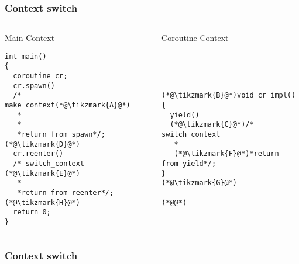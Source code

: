 \documentclass{beamer}
\def\tikzmark#1{\tikz[remember picture,overlay]\node[yshift=2pt](#1){};}
\begin{document}

\begin{frame}[fragile]
\frametitle{Context switch}
\begin{columns}
\begin{column}{0.49\textwidth}
\begin{block}{Main Context}
\begin{lstlisting}[basicstyle=\small]
int main()
{
  coroutine cr;
  cr.spawn()
  /* make_context(*@\tikzmark{A}@*)
   *
   * 
   *return from spawn*/;(*@\tikzmark{D}@*)
  cr.reenter()
  /* switch_context (*@\tikzmark{E}@*)
   *
   *return from reenter*/;(*@\tikzmark{H}@*)
  return 0;
}
\end{lstlisting}
\end{block}
\end{column}
\begin{column}{0.49\textwidth}
\begin{block}{Coroutine Context}
\begin{lstlisting}[basicstyle=\small, numbers=right]




(*@\tikzmark{B}@*)void cr_impl()
{
  yield()
  (*@\tikzmark{C}@*)/* switch_context
   *
   (*@\tikzmark{F}@*)*return from yield*/;
}
(*@\tikzmark{G}@*)

(*@@*)  
\end{lstlisting}
\end{block}
\end{column}
\end{columns}

\end{frame}


\begin{frame}[fragile]
\frametitle{Context switch}
\begin{adjustbox}{max totalsize={.9\textwidth}{.9\textheight},center}

\end{adjustbox}

\end{frame}
\end{document}
